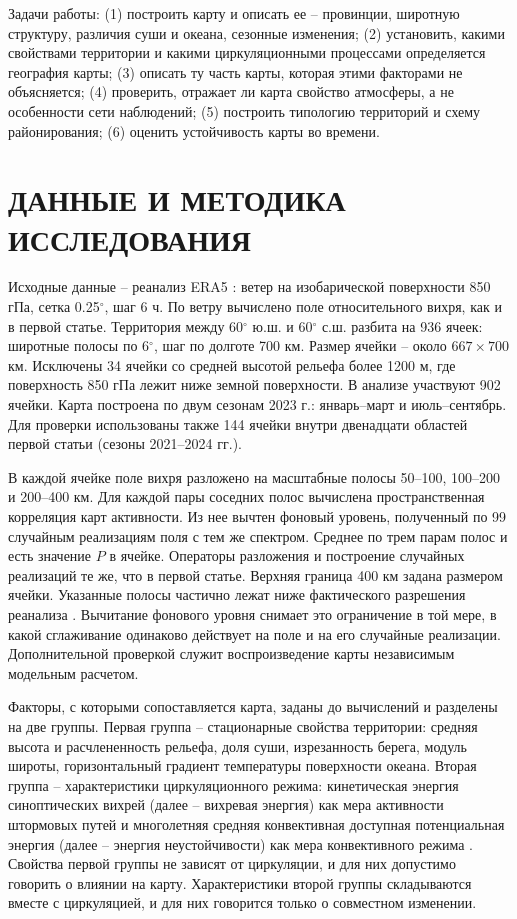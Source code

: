 \documentclass[12pt,a4paper]{article}
\begin{document}
Задачи работы: (1) построить карту и описать ее -- провинции, широтную структуру, различия суши и океана, сезонные изменения; (2) установить, какими свойствами территории и какими циркуляционными процессами определяется география карты; (3) описать ту часть карты, которая этими факторами не объясняется; (4) проверить, отражает ли карта свойство атмосферы, а не особенности сети наблюдений; (5) построить типологию территорий и схему районирования; (6) оценить устойчивость карты во времени.

\section{ДАННЫЕ И МЕТОДИКА ИССЛЕДОВАНИЯ}

Исходные данные -- реанализ ERA5 \cite{Hersbach2020,Soci2024}: ветер на изобарической поверхности 850 гПа, сетка 0.25$^\circ$, шаг 6 ч. По ветру вычислено поле относительного вихря, как и в первой статье. Территория между 60$^\circ$ ю.ш. и 60$^\circ$ с.ш. разбита на 936 ячеек: широтные полосы по 6$^\circ$, шаг по долготе 700 км. Размер ячейки -- около $667 \times 700$ км. Исключены 34 ячейки со средней высотой рельефа более 1200 м, где поверхность 850 гПа лежит ниже земной поверхности. В анализе участвуют 902 ячейки. Карта построена по двум сезонам 2023 г.: январь--март и июль--сентябрь. Для проверки использованы также 144 ячейки внутри двенадцати областей первой статьи (сезоны 2021--2024 гг.).

В каждой ячейке поле вихря разложено на масштабные полосы 50--100, 100--200 и 200--400 км. Для каждой пары соседних полос вычислена пространственная корреляция карт активности. Из нее вычтен фоновый уровень, полученный по 99 случайным реализациям поля с тем же спектром. Среднее по трем парам полос и есть значение $P$ в ячейке. Операторы разложения и построение случайных реализаций те же, что в первой статье. Верхняя граница 400 км задана размером ячейки. Указанные полосы частично лежат ниже фактического разрешения реанализа \cite{Skamarock2004,Bolgiani2022}. Вычитание фонового уровня снимает это ограничение в той мере, в какой сглаживание одинаково действует на поле и на его случайные реализации. Дополнительной проверкой служит воспроизведение карты независимым модельным расчетом.

Факторы, с которыми сопоставляется карта, заданы до вычислений и разделены на две группы. Первая группа -- стационарные свойства территории: средняя высота и расчлененность рельефа, доля суши, изрезанность берега, модуль широты, горизонтальный градиент температуры поверхности океана. Вторая группа -- характеристики циркуляционного режима: кинетическая энергия синоптических вихрей (далее -- вихревая энергия) как мера активности штормовых путей \cite{Blackmon1976,HoskinsHodges2019} и многолетняя средняя конвективная доступная потенциальная энергия (далее -- энергия неустойчивости) как мера конвективного режима \cite{RiemannCampe2009}. Свойства первой группы не зависят от циркуляции, и для них допустимо говорить о влиянии на карту. Характеристики второй группы складываются вместе с циркуляцией, и для них говорится только о совместном изменении.
\end{document}

